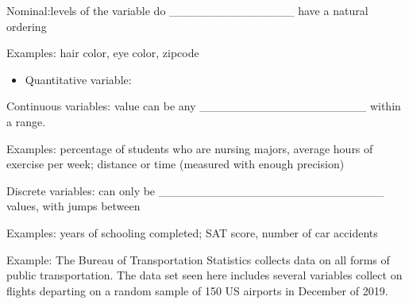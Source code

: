 \documentclass[
]{report}
\providecommand{\tightlist}{%
  \setlength{\itemsep}{0pt}\setlength{\parskip}{0pt}}
\newcommand{\rgi}{\hspace{24pt}}  %
\begin{document}
\rgi Nominal:levels of the variable do \_\_\_\_\_\_\_\_\_\_\_\_\_\_\_ have a natural ordering

\rgi \rgi Examples: hair color, eye color, zipcode

\begin{itemize}
\tightlist
\item
  Quantitative variable:
\end{itemize}

\vspace{0.5in}

\rgi Continuous variables: value can be any \_\_\_\_\_\_\_\_\_\_\_\_\_\_\_\_\_\_\_\_ within a range.

\rgi \rgi Examples: percentage of students who are nursing majors, average hours of exercise per week; distance or time (measured with enough precision)

\rgi Discrete variables: can only be \_\_\_\_\_\_\_\_\_\_\_\_\_\_\_\_\_\_\_\_\_\_\_\_\_\_\_ values, with jumps between

\rgi \rgi Examples: years of schooling completed; SAT score, number of car accidents

Example: The Bureau of Transportation Statistics collects data on all forms of public transportation. The data set seen here includes several variables collect on flights departing on a random sample of 150 US airports in December of 2019.
\end{document}
